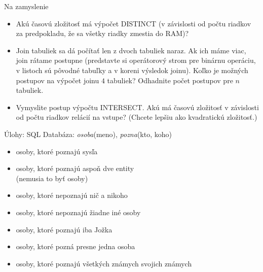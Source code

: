 \documentclass[12pt]{beamer}
\begin{document}
\begin{frame}{Na zamyslenie}
\begin{itemize}
\item Akú časovú zložitosť má výpočet DISTINCT (v závislosti od počtu riadkov za predpokladu, že sa všetky riadky zmestia do RAM)?
\item Join tabuliek sa dá počítať len z dvoch tabuliek naraz. Ak ich máme viac, join rátame postupne
    (predstavte si operátorový strom pre binárnu operáciu, v listoch sú pôvodné tabuľky a v koreni výsledok joinu).
    Koľko je možných postupov na výpočet joinu $4$ tabuliek? Odhadnite počet postupov pre $n$ tabuliek.
\item Vymyslite postup výpočtu INTERSECT. Akú má časovú zložitosť v závislosti od počtu riadkov relácií na vstupe? (Chcete lepšiu ako kvadratickú zložitosť.)
\end{itemize}
\end{frame}


\begin{frame}{Úlohy: SQL}
Databáza: \emph{osoba}(meno), \emph{pozna}(kto, koho)
\begin{itemize}
    \item osoby, ktoré poznajú sysľa
    \item osoby, ktoré poznajú aspoň dve entity\\ (nemusia to byť osoby)
    \item osoby, ktoré nepoznajú nič a nikoho
    \item osoby, ktoré nepoznajú žiadne iné osoby
    \item osoby, ktoré poznajú iba Jožka
    \item osoby, ktoré pozná presne jedna osoba
    \item osoby, ktoré poznajú všetkých známych svojich známych
\end{itemize}
\end{frame}
\end{document}
